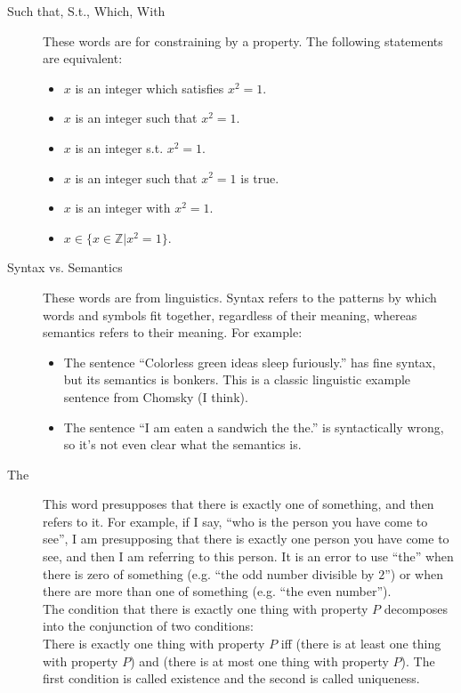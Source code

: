 \documentclass[12pt]{article}
\begin{document}
\begin{description}
  \item[Such that, S.t., Which, With] These words are for constraining by a
    property.  The following statements are equivalent:
    \begin{itemize}
    \item $x$ is an integer which satisfies $x^2=1$. 
    \item $x$ is an integer such that $x^2=1$. 
    \item $x$ is an integer s.t. $x^2=1$. 
    \item $x$ is an integer such that $x^2=1$ is true. 
    \item $x$ is an integer with $x^2=1$. 
    \item $x\in \{x\in\mathbb{Z} | x^2=1\}$. 
    \end{itemize}

  \item[Syntax vs. Semantics] These words are from linguistics.
    Syntax refers to the patterns by which words and symbols fit
    together, regardless of their meaning, whereas semantics refers to
    their meaning.  For example:

    \begin{itemize}
      \item The sentence ``Colorless green ideas sleep furiously.''
        has fine syntax, but its semantics is bonkers.  This is a
        classic linguistic example sentence from Chomsky (I think).
      \item The sentence ``I am eaten a sandwich the the.'' is
        syntactically wrong, so it's not even clear what the semantics
        is.
    \end{itemize}

  \item[The] This word presupposes that there is exactly one of
    something, and then refers to it.  For example, if I say, ``who is
    the person you have come to see'', I am presupposing that there is
    exactly one person you have come to see, and then I am referring
    to this person.  It is an error to use ``the'' when there is zero
    of something (e.g. ``the odd number divisible by $2$'') or when
    there are more than one of something (e.g. ``the even number'').\\

    The condition that there is exactly one thing with property $P$
    decomposes into the conjunction of two conditions: \\

    There is exactly one thing with property $P$ iff (there is at
    least one thing with property $P$) and (there is at most one thing
    with property $P$).  The first condition is called existence and
    the second is called uniqueness.


\end{description}
\end{document}

